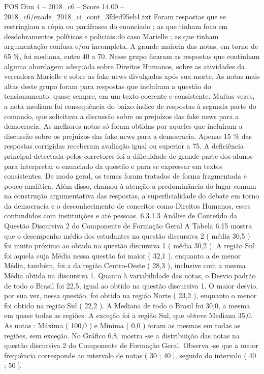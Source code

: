 \begin{textsample}{POS Dim 4 – 2018\_c6 – Score 14.00 – 2018\_c6/enade\_2018\_ci\_cont\_3fded95eb1.txt}
Foram respostas que se restringiam a cópia ou paráfrases do enunciado ; as que tinham foco em desdobramentos políticos e policiais do caso Marielle ; as que tinham argumentação confusa e/ou incompleta.
A grande maioria das notas, em torno de 65 \%, foi mediana, entre 40 a 70.
Nesse grupo ficaram as respostas que continham alguma abordagem adequada sobre Direitos Humanos, sobre as atividades da vereadora Marielle e sobre as fake news divulgadas após sua morte.
As notas mais altas deste grupo foram para respostas que incluíram a questão do tensionamento, quase sempre, em um texto coerente e consistente.
Muitas vezes, a nota mediana foi consequência do baixo índice de respostas à segunda parte do comando, que solicitava a discussão sobre os prejuízos das fake news para a democracia.
As melhores notas só foram obtidas por aqueles que incluíram a discussão sobre os prejuízos das fake news para a democracia.
Apenas 15 \% das respostas corrigidas receberam avaliação igual ou superior a 75.
A deficiência principal detectada pelos corretores foi a dificuldade de grande parte dos alunos para interpretar o enunciado da questão e para se expressar em textos consistentes.
De modo geral, os temas foram tratados de forma fragmentada e pouco analítica.
Além disso, chamou à atenção a predominância do lugar comum na construção argumentativa das respostas, a superficialidade do debate em torno da democracia e o desconhecimento de conceitos como Direitos Humanos, esses confundidos com instituições e até pessoas. 6.3.1.3 Análise de Conteúdo da Questão Discursiva 2 do Componente de Formação Geral A Tabela 6.15 mostra que o desempenho médio dos estudantes na questão discursiva 2 ( média 30,5 ) foi muito próximo ao obtido na questão discursiva 1 ( média 30,2 ).
A região Sul foi aquela cuja Média nessa questão foi maior ( 32,1 ), enquanto a de menor Média, também, foi a da região Centro-Oeste ( 28,3 ), inclusive com a mesma Média obtida na discursiva 1.
Quanto à variabilidade das notas, o Desvio padrão de todo o Brasil foi 22,5, igual ao obtido na questão discursiva 1.
O maior desvio, por sua vez, nessa questão, foi obtido na região Norte ( 23,2 ), enquanto o menor foi obtido na região Sul ( 22,2 ).
A Mediana de todo o Brasil foi 30,0, a mesma em quase todas as regiões.
A exceção foi a região Sul, que obteve Mediana 35,0.
As notas : Máxima ( 100,0 ) e Mínima ( 0,0 ) foram as mesmas em todas as regiões, sem exceção.
No Gráfico 6.8, mostra -se a distribuição das notas na questão discursiva 2 do Componente de Formação Geral.
Observa -se que a maior frequência corresponde ao intervalo de notas ( 30 ; 40 ], seguido do intervalo ( 40 ; 50 ].

\end{textsample}
